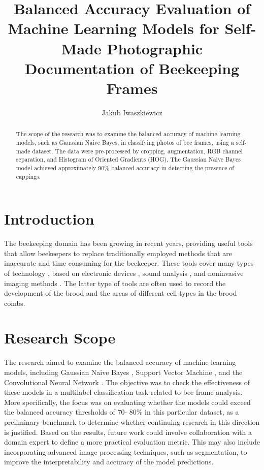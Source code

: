 \documentclass{llncs}
\begin{document}
\title{Balanced Accuracy Evaluation of Machine Learning Models for Self-Made Photographic Documentation of Beekeeping Frames}
\author{Jakub Iwaszkiewicz}
\maketitle

\begin{abstract}
The scope of the research was to examine the balanced accuracy of machine learning models, such as Gaussian Naive Bayes, in classifying photos of bee frames, using a self-made dataset. The data were pre-processed by cropping, augmentation, RGB channel separation, and Histogram of Oriented Gradients (HOG). The Gaussian Naive Bayes model achieved approximately 90\% balanced accuracy in detecting the presence of cappings.
\end{abstract}

\section{Introduction}
The beekeeping domain has been growing in recent years, providing
useful tools that allow beekeepers to replace traditionally employed
methods that are inaccurate and time consuming for the beekeeper.
These tools cover many types of technology \cite{ref_HADJUR2022106604}, based
on electronic devices \cite{ref_FLORES20191111},
sound analysis \cite{ref_UTHOFF2023107589}, and noninvasive imaging methods \cite{ref_RODRIGUEZLOZANO2024109573}. The latter type of tools are often
used to record the development of the brood and the areas of different cell types
in the brood combs.

\section{Research Scope}
The research aimed to examine the balanced accuracy of machine learning models, including Gaussian Naive Bayes \cite{ref_gnb_article}, Support Vector Machine \cite{ref_svm_article}, and the Convolutional Neural Network \cite{ref_deep_learning}. The objective was to check the effectiveness of these models in a multilabel classification task related to bee frame \cite{ref_beekeeper_handbook} analysis.
More specifically, the focus was on evaluating whether the models could exceed the balanced accuracy thresholds of 70- 80\% in this particular dataset, as a preliminary benchmark to determine whether continuing research in this direction is justified. Based on the results, future work could involve collaboration with a domain expert to define a more practical evaluation metric. This may also include incorporating advanced image processing techniques, such as segmentation, to improve the interpretability and accuracy of the model predictions.
\end{document}
